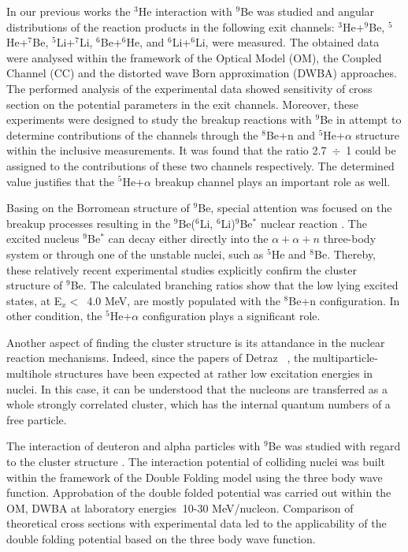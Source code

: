 \documentclass[10pt]{iopart}
\begin{document}
In our previous works \cite{lukyanov2014, lukyanov2015, janseitov2018} the ${}^3$He interaction with ${}^9$Be was studied and angular distributions of the reaction products in the following exit channels: ${}^3$He+$^9$Be, ${}^5$He+$^7$Be, ${}^5$Li+$^7$Li, ${}^6$Be+$^6$He, and ${}^6$Li+$^6$Li, were measured. The obtained data were analysed within the framework of the Optical Model (OM), the Coupled Channel (CC) and the distorted wave Born approximation (DWBA) approaches. The performed analysis of the experimental data showed  sensitivity of cross section on the potential parameters in the exit channels. Moreover, these experiments were designed to study the breakup reactions with ${}^9$Be in attempt to determine contributions of the channels through the ${}^8$Be+n  and  ${}^5$He+$\alpha$ structure within the inclusive measurements. It was found that the ratio 2.7~$\div$~1 could be assigned to the contributions of these two channels respectively. The determined value justifies that the ${}^5$He+$\alpha$ breakup channel plays an important role as well.

Basing on the Borromean structure of ${}^9$Be, special attention was focused on the breakup processes resulting in the ${}^9$Be($^6$Li, ${}^6$Li)$^9$Be$^*$ nuclear reaction \cite{brown2007, papka2007}. The excited nucleus ${}^9$Be$^*$ can decay either directly into the $\alpha+\alpha+n$ three-body system or through one of the unstable nuclei, such as ${}^5$He and ${}^8$Be. Thereby, these relatively recent experimental studies explicitly confirm the cluster structure of ${}^9$Be.
The calculated branching ratios  show that the low lying excited states, at E$_x <$~4.0 MeV,  are mostly populated with the ${}^8$Be+n configuration. In other condition, the ${}^5$He+$\alpha$ configuration plays a significant  role.

Another aspect of finding the cluster structure is its attandance in the nuclear reaction mechanisms. Indeed, since the papers of Detraz \etal~\cite{detraz1970, detraz1974}, the multiparticle-multihole structures have been expected at rather low excitation energies in nuclei. In this case, it can be understood that the nucleons are transferred as a whole strongly correlated cluster, which has the internal quantum numbers of a free particle.

The interaction of deuteron and alpha particles with ${}^9$Be was studied with regard to the cluster structure \cite{urazbekov2016, urazbekov2017}. The interaction potential of colliding nuclei was built within the framework of the Double Folding model using the three body wave function. Approbation of the double folded potential was carried out within the OM, DWBA at laboratory energies $~$10-30 MeV/nucleon. Comparison of theoretical cross sections with experimental data led to the applicability of the double folding potential based on the three body wave function.
\end{document}
